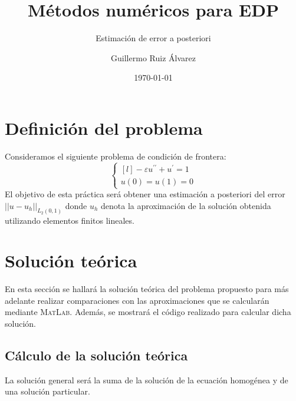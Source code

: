 \documentclass[spanish]{mathnotes}
\title{Métodos numéricos para EDP}
\subtitle{Estimación de error a posteriori}
\author{Guillermo Ruiz Álvarez}
\date{\today}
\begin{document}
	\makepre
	
	\section{Definición del problema}
	Consideramos el siguiente problema de condición de frontera:
	\begin{equation*}
		\left\{
		\begin{matrix*}[l]
			-\varepsilon u^{\prime\prime}+u^\prime = 1\\
			u(0)=u(1)=0
		\end{matrix*}
		\right.
	\end{equation*}
	El objetivo de esta práctica será obtener una estimación a posteriori del error $||u-u_h||_{L_2(0,1)}$ donde $u_h$ denota la aproximación de la solución obtenida utilizando elementos finitos lineales.
	
	\section{Solución teórica}
	En esta sección se hallará la solución teórica del problema propuesto para más adelante realizar comparaciones con las aproximaciones que se calcularán mediante \textsc{MatLab}. Además, se mostrará el código realizado para calcular dicha solución.
	
	\subsection{Cálculo de la solución teórica}
	La solución general será la suma de la solución de la ecuación homogénea y de una solución particular.
	
\end{document}
